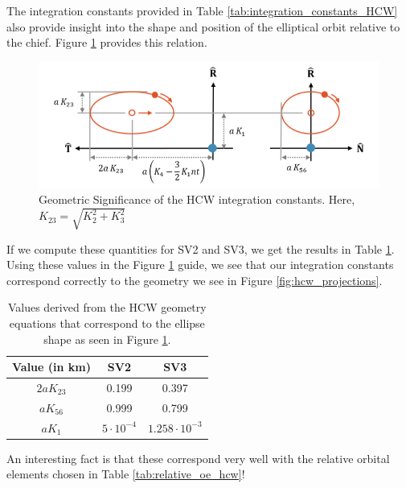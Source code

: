 The integration constants provided in Table \ref{tab:integration_constants_HCW} also provide insight into the shape and position of the elliptical orbit relative to the chief. Figure \ref{fig:hcw_gemeotry} provides this relation. 

\begin{figure}[htpb]
    \centering
    \includegraphics[width=0.75\linewidth]{LaTeX//PS3/hcw_integration_constants.png}
    \caption{Geometric Significance of the HCW integration constants. Here, $K_{23} = \sqrt{K_2^2 + K_3^2}$ \cite{willis2023analytical}}
    \label{fig:hcw_gemeotry}
\end{figure}

If we compute these quantities for SV2 and SV3, we get the results in Table \ref{tab:HCW_geometry_values}. Using these values in the Figure \ref{fig:hcw_gemeotry} guide, we see that our integration constants correspond correctly to the geometry we see in Figure \ref{fig:hcw_projections}.

\begin{table}[htpb]
    \centering
    \renewcommand{\arraystretch}{1.2}
    \begin{tabular}{c c c}
        \toprule
        \textbf{Value (in km)} & \textbf{SV2} & \textbf{SV3} \\
        \midrule
        $2aK_{23}$ & 0.199 & 0.397 \\
        $aK_{56}$ & 0.999 & 0.799 \\
        $aK_1$ & $5\cdot10^{-4}$& $1.258\cdot10^{-3}$\\
        \bottomrule
    \end{tabular}
    \caption{Values derived from the HCW geometry equations that correspond to the ellipse shape as seen in Figure \ref{fig:hcw_gemeotry}.}
    \label{tab:HCW_geometry_values}
\end{table}

An interesting fact is that these correspond very well with the relative orbital elements chosen in Table \ref{tab:relative_oe_hcw}!

